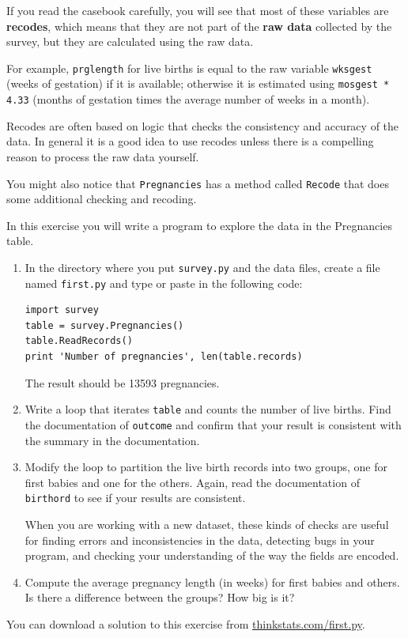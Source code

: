 \documentclass[12pt]{book}
\begin{document}
If you read the casebook carefully, you will see that most of these
variables are {\bf recodes}, which means that they are not part
of the {\bf raw data} collected by the survey, but they are
calculated using the raw data.

For example, {\tt prglength} for live births is equal to the raw
variable {\tt wksgest} (weeks of gestation) if it is available;
otherwise it is estimated using {\tt mosgest * 4.33} (months of
gestation times the average number of weeks in a month).

Recodes are often based on logic that checks the consistency and
accuracy of the data.  In general it is a good idea to use recodes
unless there is a compelling reason to process the raw data
yourself.

You might also notice that {\tt Pregnancies} has a method called
{\tt Recode} that does some additional checking and recoding.

\begin{exercise}
In this exercise you will write a program to explore the data
in the Pregnancies table.

\begin{enumerate}

\item In the directory where you put {\tt survey.py} and the
data files, create a file named \verb"first.py" and
type or paste in the following code:
%
\begin{verbatim}
import survey
table = survey.Pregnancies()
table.ReadRecords()
print 'Number of pregnancies', len(table.records)
\end{verbatim}

The result should be 13593 pregnancies.

\item Write a loop that iterates \verb"table" and counts
the number of live births.  Find the documentation of {\tt outcome}
and confirm that your result is consistent with the summary
in the documentation.

\item Modify the loop to partition the live birth records into
two groups, one for first babies and one for the others.  Again,
read the documentation of {\tt birthord} to see if your results
are consistent.

When you are working with a new dataset, these kinds of checks
are useful for finding errors and inconsistencies in the data,
detecting bugs in your program, and checking your understanding
of the way the fields are encoded.

\item Compute the average pregnancy length (in weeks) for first
babies and others.  Is there a difference between the groups?  How
big is it?

\end{enumerate}

You can download a solution to this exercise from
\url{thinkstats.com/first.py}.

\end{exercise}
\end{document}
